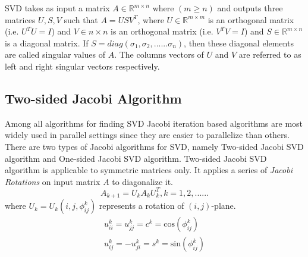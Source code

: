 \documentclass[10pt, conference, compsocconf]{IEEEtran}
\begin{document}
\par SVD takes as input a matrix $A \in \mathbb{R}^{m \times n}$ where $(m \geq n)$ and outputs three matrices $U, S, V$ such that $A = USV^T$, where $U \in \mathbb{R}^{m \times m}$ is an orthogonal matrix (i.e. $U^TU = I$) and $V \in n \times n$ is an orthogonal matrix (i.e. $V^TV = I$) and $S \in \mathbb{R}^{m \times n}$ is a diagonal matrix. If $S = diag(\sigma_1, \sigma_2,......\sigma_n)$, then these diagonal elements are called singular values of $A$. The columns vectors of $U$ and $V$ are referred to as left and right singular vectors respectively.

\subsection{Two-sided Jacobi Algorithm}

\par Among all algorithms for finding SVD Jacobi iteration based algorithms are most widely used in parallel settings since they are easier to parallelize than others. There are two types of Jacobi algorithms for SVD, namely Two-sided Jacobi SVD algorithm and One-sided Jacobi SVD algorithm. Two-sided Jacobi SVD algorithm is applicable to symmetric matrices only. It applies a series of \textit{Jacobi Rotations} on input matrix $A$ to diagonalize it. 
\[
A_{k+1} = U_kA_kU_k^T, k =1,2,......
\]   
where $U_k = U_k(i,j,\phi^k_{ij})$ represents a rotation of $(i,j)$-plane. 
\begin{gather}
u_{ii}^k = u_{jj}^k = c^k = \text{cos}(\phi^k_{ij}) \\
u_{ij}^k = -u_{ji}^k = s^k = \text{sin}(\phi^k_{ij}) 
\end{gather}
\end{document}
